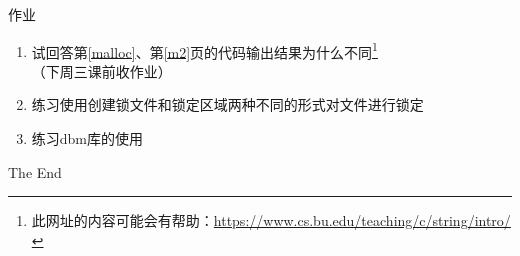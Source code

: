 \documentclass{beamer}
\begin{document}
\begin{frame}{作业}
\begin{enumerate}
\item
试回答第\ref{malloc}、第\ref{m2}页的代码输出结果为什么不同\footnote{此网址的内容可能会有帮助：\url{https://www.cs.bu.edu/teaching/c/string/intro/}}（下周三课前收作业）
\item
练习使用创建锁文件和锁定区域两种不同的形式对文件进行锁定
\item
练习dbm库的使用
\end{enumerate}
\end{frame}

\begin{frame}
\Huge{\centerline{The End}}
\end{frame}
\end{document}

